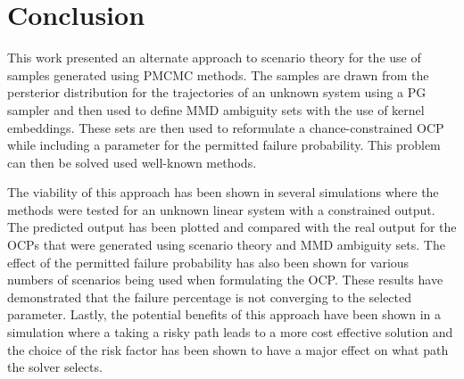 \chapter{Conclusion} \label{Conclusion}

This work presented an alternate approach to scenario theory for the use of samples generated using PMCMC methods. The samples are drawn from the persterior distribution for the trajectories of an unknown system using a PG sampler and then used to define MMD ambiguity sets with the use of kernel embeddings. These sets are then used to reformulate a chance-constrained OCP while including a parameter for the permitted failure probability. This problem can then be solved used well-known methods.

The viability of this approach has been shown in several simulations where the methods were tested for an unknown linear system with a constrained output. The predicted output has been plotted and compared with the real output for the OCPs that were generated using scenario theory and MMD ambiguity sets. The effect of the permitted failure probability has also been shown for various numbers of scenarios being used when formulating the OCP. These results have demonstrated that the failure percentage is not converging to the selected parameter. Lastly, the potential benefits of this approach have been shown in a simulation where a taking a risky path leads to a more cost effective solution and the choice of the risk factor has been shown to have a major effect on what path the solver selects.





